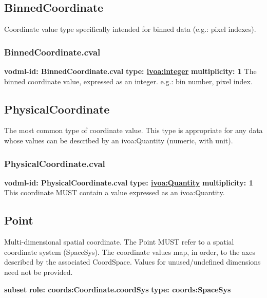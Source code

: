   \subsection{BinnedCoordinate}
  \label{sect:BinnedCoordinate}
    Coordinate value type specifically intended for binned data (e.g.: pixel indexes).

    \subsubsection{BinnedCoordinate.cval}
      \textbf{vodml-id: BinnedCoordinate.cval} \newline
      \textbf{type: \hyperref[sect:ivoa]{ivoa:integer}} \newline
      \textbf{multiplicity: 1} \newline 
      The binned coordinate value, expressed as an integer. e.g.: bin number, pixel index.


  \subsection{PhysicalCoordinate}
  \label{sect:PhysicalCoordinate}
    The most common type of coordinate value. This type is appropriate for any data whose values can be described by an ivoa:Quantity (numeric, with unit).

    \subsubsection{PhysicalCoordinate.cval}
      \textbf{vodml-id: PhysicalCoordinate.cval} \newline
      \textbf{type: \hyperref[sect:ivoa]{ivoa:Quantity}} \newline
      \textbf{multiplicity: 1} \newline 
      This coordinate MUST contain a value expressed as an ivoa:Quantity.


  \subsection{Point}
  \label{sect:Point}
    Multi-dimensional spatial coordinate. The Point MUST refer to a spatial coordinate system (SpaceSys). The coordinate values map, in order, to the axes described by the associated CoordSpace. Values for unused/undefined dimensions need not be provided.

    \noindent \textbf{subset} \newline
    \indent   \textbf{role: coords:Coordinate.coordSys} \newline
    \indent   \textbf{type: coords:SpaceSys} \newline


